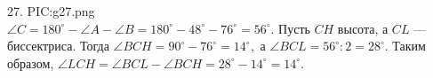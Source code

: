 27. {{PIC:g27.png}}\\
$\angle C=180^\circ-\angle A-\angle B=180^\circ-48^\circ-76^\circ=56^\circ.$ Пусть $CH$ высота, а $CL$ --- биссектриса. Тогда $\angle BCH=90^\circ-76^\circ=14^\circ,$ а $\angle BCL=56^\circ:2=28^\circ.$ Таким образом, $\angle LCH=\angle BCL- \angle BCH=28^\circ-14^\circ=14^\circ.$\\
